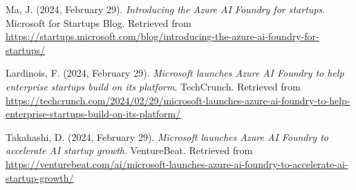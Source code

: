\documentclass[11pt, a4paper]{article}
\begin{document}
\begin{thebibliography}{9}

Ma, J. (2024, February 29). \textit{Introducing the Azure AI Foundry for startups}. Microsoft for Startups Blog.
\newblock Retrieved from \url{https://startups.microsoft.com/blog/introducing-the-azure-ai-foundry-for-startups/}

Lardinois, F. (2024, February 29). \textit{Microsoft launches Azure AI Foundry to help enterprise startups build on its platform}. TechCrunch.
\newblock Retrieved from \url{https://techcrunch.com/2024/02/29/microsoft-launches-azure-ai-foundry-to-help-enterprise-startups-build-on-its-platform/}

Takahashi, D. (2024, February 29). \textit{Microsoft launches Azure AI Foundry to accelerate AI startup growth}. VentureBeat.
\newblock Retrieved from \url{https://venturebeat.com/ai/microsoft-launches-azure-ai-foundry-to-accelerate-ai-startup-growth/}

\end{thebibliography}
\end{document}
